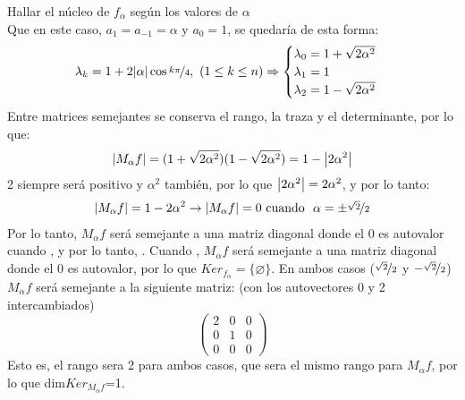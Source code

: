 \documentclass[11pt]{article}
\begin{document}
\begin{question}
\begin{subquestion}{Hallar el núcleo de $f_{\alpha}$ según los valores de $\alpha$}
{\begin{equation*}
        \end{equation*}
        Que en este caso, $a_{1}=a_{-1}=\alpha$ y $a_{0}=1$, se quedaría de esta forma:
        \begin{equation*}
            \lambda_{k}=1+2\abs{\alpha}\cos{\nicefrac{k\pi}{4}}, \ (1\leq k \leq n)
            \Rightarrow
            \begin{cases}
                \lambda_{0} = 1+\sqrt{2\alpha^{2}}\\
                \lambda_{1} = 1\\
                \lambda_{2} = 1-\sqrt{2\alpha^{2}}
            \end{cases}
        \end{equation*}
        Entre matrices semejantes se conserva el rango, la traza y el determinante, por lo que:
        \begin{align*}
            \abs{M_{\alpha}f}=(1+\sqrt{2\alpha^{2}})(1-\sqrt{2\alpha^{2}})=1-\abs{2\alpha^{2}}
        \end{align*}
        2 siempre será positivo y $\alpha^{2}$ también, por lo que $\abs{2\alpha^{2}}=2\alpha^{2}$, y por lo tanto:
        \begin{align*}
            \abs{M_{\alpha}f}=1-2\alpha^{2} \rightarrow \abs{M_{\alpha}f}=0 \text{\ cuando \ } \alpha = \pm\nicefrac{\sqrt{2}}{2}
        \end{align*}
        Por lo tanto, $M_{\alpha}f$ será semejante a una matriz diagonal donde el 0  es autovalor cuando , y por lo tanto, .
        \newline
        Cuando , $M_{\alpha}f$ será semejante a una matriz diagonal donde el 0  es autovalor, por lo que $Ker_{f_{\alpha}}=\{\varnothing\}$. En ambos casos ($\nicefrac{\sqrt{2}}{2}$ y $-\nicefrac{\sqrt{2}}{2}$) $M_{\alpha}f$ será semejante a la siguiente matriz: (con los autovectores 0 y 2 intercambiados)
        \begin{equation*}
            \begin{pmatrix}
                2   &   0   &   0\\
                0   &   1   &   0\\
                0   &   0   &   0
            \end{pmatrix}
        \end{equation*}
        Esto es, el rango sera 2 para ambos casos, que sera el mismo rango para $M_{\alpha}f$, por lo que dim$Ker_{M_{\alpha}f}$=1.
}
\end{subquestion}
\end{question}
\end{document}
